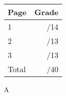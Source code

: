 \documentclass[12pt]{article}
\newcommand{\skipline}{\vspace{12pt}}
\begin{document}
\begin{table}[hbt]
\begin{center}
\begin{tabular}{|l|r|} \hline
Page&Grade\\
\hline \hline
\cline{1-2} 1 & \enspace\enspace\enspace\enspace\enspace\enspace/14\\
\cline{1-2} 2 & \enspace\enspace\enspace\enspace\enspace\enspace/13\\
\cline{1-2} 3 & \enspace\enspace\enspace\enspace\enspace\enspace/13\\
\cline{1-2} Total & \enspace\enspace\enspace\enspace\enspace\enspace/40\\
\hline
\end{tabular}

\skipline

\skipline

\skipline

A
\end{center}
\end{table}
\newpage
\end{document}
